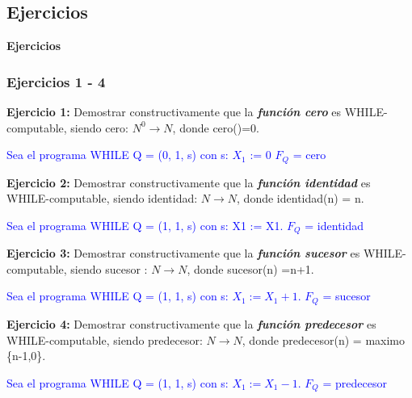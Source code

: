 \documentclass[xcolor=table]{beamer}
\begin{document}
\subsection{Ejercicios}
\begin{frame}  \Large

\begin{center}
    \textbf{Ejercicios }
\end{center}

\end{frame} 

\begin{frame}[fragile]\frametitle{Ejercicios 1 - 4} \scriptsize

\textbf{Ejercicio 1:} Demostrar constructivamente que la \textbf{\textit{función cero}} es WHILE-computable, siendo cero: $N^0 \rightarrow	N$,	donde cero()=0.	
\hspace{0.2cm}

\vspace{0.1cm }\textcolor{blue}{Sea	el	programa	WHILE	Q	=	(0,	1,	s)	con	s:	$X_1$	:=	0 $F_Q$ =	cero}

\hspace{0.4cm}

\textbf{Ejercicio 2:} Demostrar	constructivamente	que	la	\textbf{\textit{función	identidad}}	es	WHILE-computable,	siendo	identidad:	$N \rightarrow	N$,	donde identidad(n)	=	n.	

\vspace{0.1cm }\textcolor{blue}{Sea	el	programa	WHILE	Q	=	(1,	1,	s)	con	s:	X1	:=	X1. $F_Q$ =	identidad}


\hspace{0.4cm}

\textbf{Ejercicio 3:} Demostrar	constructivamente	que	la	\textit{\textbf{función	sucesor}}	es	WHILE-computable,	 siendo	sucesor :	$N \rightarrow N$,	donde	sucesor(n)	=n+1.	

\vspace{0.1cm }\textcolor{blue}{Sea	el	programa	WHILE	Q	=	(1,	1,	s)	con	s:	
$X_1	:=X_1 + 1$.	$F_Q$ =	sucesor}


\hspace{0.4cm}

\textbf{Ejercicio 4:} Demostrar	constructivamente	que	la	\textbf{\textit{función	predecesor}}	es	WHILE-computable,	siendo	predecesor:	$N \rightarrow N$,	donde predecesor(n)	=	maximo \{n-1,0\}.		

\vspace{0.1cm }\textcolor{blue}{Sea	el	programa	WHILE	Q	=	(1,	1,	s)	con	s:	$X_1:=X_1-1$. $F_Q$ =	predecesor }
\end{frame}
\end{document}

